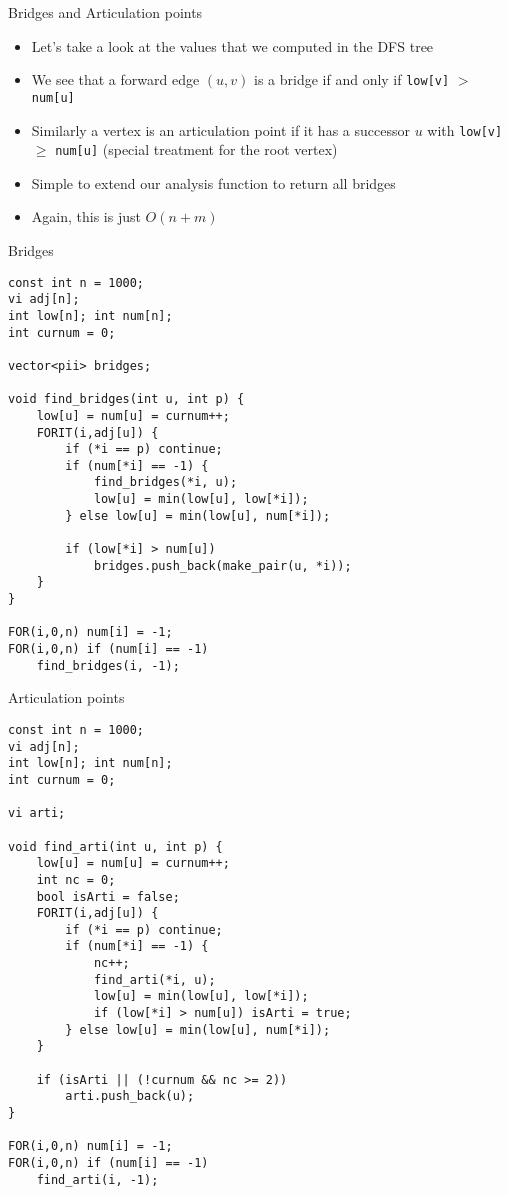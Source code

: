 \documentclass[12pt,t]{beamer}
\newcommand{\bi}{\begin{itemize}}
\newcommand{\ei}{\end{itemize}}
\begin{document}
\begin{frame}{Bridges and Articulation points}
    \vspace{20pt}
    \bi
        \item Let's take a look at the values that we computed in the DFS tree
        \vspace{10pt} \pause
        \item We see that a forward edge $(u,v)$ is a bridge if and only if \texttt{low[v]} $>$ \texttt{num[u]}
        \vspace{10pt}
        \item Similarly a vertex is an articulation point if it has a successor $u$ with \texttt{low[v]} $\geq$ \texttt{num[u]} (special treatment for the root vertex)
        \vspace{10pt}
        \item Simple to extend our analysis function to return all bridges
        \item Again, this is just $O(n + m)$
    \ei
\end{frame}

\begin{frame}[fragile]{Bridges}
    \begin{verbatim}
const int n = 1000;
vi adj[n];
int low[n]; int num[n];
int curnum = 0;

vector<pii> bridges;

void find_bridges(int u, int p) {
    low[u] = num[u] = curnum++;
    FORIT(i,adj[u]) {
        if (*i == p) continue;
        if (num[*i] == -1) {
            find_bridges(*i, u);
            low[u] = min(low[u], low[*i]);
        } else low[u] = min(low[u], num[*i]);

        if (low[*i] > num[u])
            bridges.push_back(make_pair(u, *i));
    }
}

FOR(i,0,n) num[i] = -1;
FOR(i,0,n) if (num[i] == -1) 
    find_bridges(i, -1);
    \end{verbatim}
\end{frame}

\begin{frame}[fragile]{Articulation points}
    \begin{verbatim}
const int n = 1000;
vi adj[n];
int low[n]; int num[n];
int curnum = 0;

vi arti;

void find_arti(int u, int p) {
    low[u] = num[u] = curnum++;
    int nc = 0;
    bool isArti = false;
    FORIT(i,adj[u]) {
        if (*i == p) continue;
        if (num[*i] == -1) {
            nc++;
            find_arti(*i, u);
            low[u] = min(low[u], low[*i]);
            if (low[*i] > num[u]) isArti = true;
        } else low[u] = min(low[u], num[*i]);
    }
    
    if (isArti || (!curnum && nc >= 2))
        arti.push_back(u);
}

FOR(i,0,n) num[i] = -1;
FOR(i,0,n) if (num[i] == -1) 
    find_arti(i, -1);
    \end{verbatim}
\end{frame}
\end{document}

